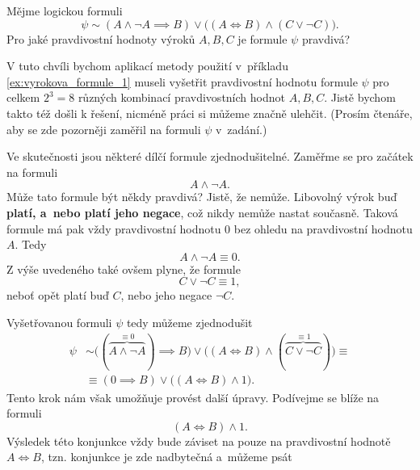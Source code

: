 \begin{example}\label{ex:vyrokova_formule_2}
    Mějme logickou formuli
    \begin{equation*}
        \psi\sim (A \land \neg A \implies B) \lor \bigl((A \iff B) \land (C \lor \neg C)\bigr).
    \end{equation*}
    Pro jaké pravdivostní hodnoty výroků $A,B,C$ je formule $\psi$ pravdivá?
    \begin{solution}
        V tuto chvíli bychom aplikací metody použití v~příkladu \ref{ex:vyrokova_formule_1} museli vyšetřit pravdivostní hodnotu formule $\psi$ pro celkem $2^3=8$ různých kombinací pravdivostních hodnot $A,B,C$. Jistě bychom takto též došli k řešení, nicméně práci si můžeme značně ulehčit. (Prosím čtenáře, aby se zde pozorněji zaměřil na formuli $\psi$ v~zadání.)\par
        Ve skutečnosti jsou některé dílčí formule zjednodušitelné. Zaměřme se pro začátek na formuli
        \begin{equation*}
            A \land \neg A.
        \end{equation*}
        Může tato formule být někdy pravdivá? Jistě, že nemůže. Libovolný výrok buď \textbf{platí, a~nebo platí jeho negace}, což nikdy nemůže nastat současně. Taková formule má pak vždy pravdivostní hodnotu 0 bez ohledu na pravdivostní hodnotu $A$. Tedy
        \begin{equation*}
            A \land \neg A\equiv 0.
        \end{equation*}
        Z výše uvedeného také ovšem plyne, že formule
        \begin{equation*}
            C \lor \neg C\equiv 1,
        \end{equation*}
        neboť opět platí buď $C$, nebo jeho negace $\neg C$.\par
        Vyšetřovanou formuli $\psi$ tedy můžeme zjednodušit
        \begin{align*}
            \psi&\sim \bigl((\overbrace{A \land \neg A}^{\equiv 0}) \implies B\bigr) \lor \bigl((A \iff B) \land (\overbrace{C \lor \neg C}^{\equiv 1})\bigr)\equiv  \\ &\equiv (0 \implies B) \lor \bigl((A \iff B) \land 1\bigr).
        \end{align*}
        Tento krok nám však umožňuje provést další úpravy. Podívejme se blíže na formuli
        \begin{equation*}
            (A \iff B) \land 1.
        \end{equation*}
        Výsledek této konjunkce vždy bude záviset na pouze na pravdivostní hodnotě $A \iff B$, tzn. konjunkce je zde nadbytečná a~můžeme psát

\end{solution}
\end{example}
